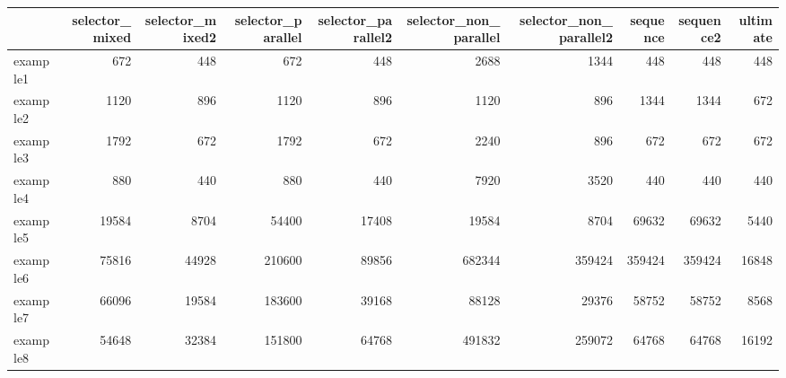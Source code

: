 \begin{tabular}{lrrrrrrrrr}
\toprule
{} &  selector\_mixed &  selector\_mixed2 &  selector\_parallel &  selector\_parallel2 &  selector\_non\_parallel &  selector\_non\_parallel2 &  sequence &  sequence2 &  ultimate \\
\midrule
example1 &             672 &              448 &                672 &                 448 &                   2688 &                    1344 &       448 &        448 &       448 \\
example2 &            1120 &              896 &               1120 &                 896 &                   1120 &                     896 &      1344 &       1344 &       672 \\
example3 &            1792 &              672 &               1792 &                 672 &                   2240 &                     896 &       672 &        672 &       672 \\
example4 &             880 &              440 &                880 &                 440 &                   7920 &                    3520 &       440 &        440 &       440 \\
example5 &           19584 &             8704 &              54400 &               17408 &                  19584 &                    8704 &     69632 &      69632 &      5440 \\
example6 &           75816 &            44928 &             210600 &               89856 &                 682344 &                  359424 &    359424 &     359424 &     16848 \\
example7 &           66096 &            19584 &             183600 &               39168 &                  88128 &                   29376 &     58752 &      58752 &      8568 \\
example8 &           54648 &            32384 &             151800 &               64768 &                 491832 &                  259072 &     64768 &      64768 &     16192 \\
\bottomrule
\end{tabular}

